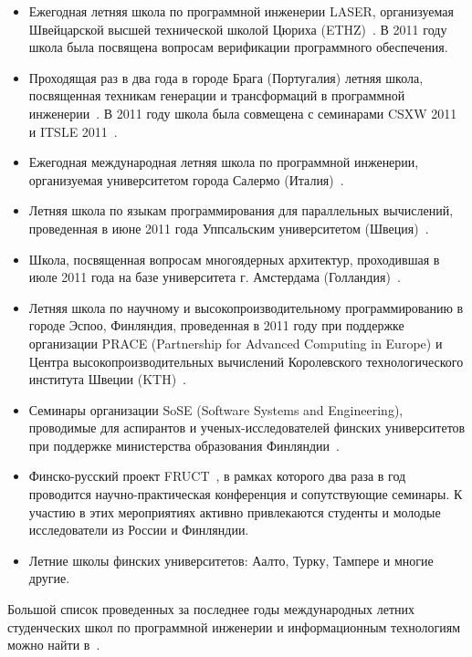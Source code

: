 \documentclass[a5paper]{article}
\begin{document}
\begin{itemize}
  \item Ежегодная летняя школа по программной инженерии LASER, организуемая Швейцарской высшей технической школой Цюриха (ETHZ)~\cite{school1}.  В 2011 году школа была посвящена вопросам верификации программного обеспечения.
  \item Проходящая раз в два года в городе Брага (Португалия) летняя школа, посвященная техникам генерации и трансформаций в программной инженерии~\cite{school2}. В  2011 году школа была совмещена с семинарами CSXW 2011~\cite{school3} и ITSLE 2011~\cite{school4}. 
  \item Ежегодная международная летняя школа по программной инженерии, организуемая университетом города Салермо (Италия)~\cite{school5}.
  \item Летняя школа по языкам программирования для параллельных вычислений, проведенная в июне 2011 года Уппсальским университетом (Швеция)~\cite{school6}.
  \item Школа, посвященная вопросам многоядерных архитектур, проходившая в июле 2011 года на базе университета г. Амстердама (Голландия)~\cite{school7}.
  \item Летняя школа по научному и высокопроизводительному программированию в городе Эспоо, Финляндия, проведенная в 2011 году при поддержке организации PRACE (Partnership for Advanced Computing in Europe) и Центра высокопроизводительных вычислений Королевского технологического института Швеции (KTH)~\cite{school8}.
  \item Семинары организации SoSE (Software Systems and Engineering), проводимые для аспирантов и ученых-исследователей финских университетов при поддержке министерства образования Финляндии~\cite{school9}.
  \item Финско-русский проект FRUCT~\cite{school10}, в рамках которого два раза в год проводится научно-практическая конференция и сопутствующие семинары. К участию в этих мероприятиях активно привлекаются студенты и молодые исследователи из России и Финляндии.  
  \item Летние школы финских университетов: Аалто, Турку, Тампере и многие другие.
\end{itemize}

Большой список проведенных за последнее годы международных летних студенческих школ по программной инженерии и информационным технологиям можно найти в~\cite{schoolList}. 
\end{document}
